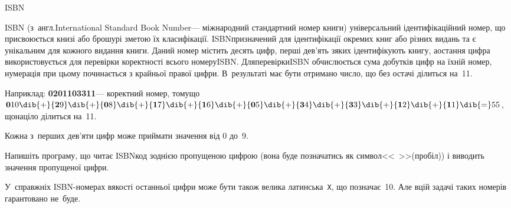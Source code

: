 \begin{problemAllDefault}{ISBN}

ISBN (з~англ.\nolinebreak[2] International Standard Book Number\nolinebreak[3] --- міжнародний стандартний номер книги) універсальний ідентифікаційний номер, що присвоюється книзі або брошурі з\nolinebreak[3] метою їх класифікації. ISBN\nolinebreak[3] призначений для ідентифікації окремих книг або різних видань та є унікальним для кожного видання книги. Даний номер містить десять цифр, перші дев'ять з\nolinebreak[3] яких ідентифікують книгу, а\nolinebreak[3] остання цифра використовується для перевірки коректності всього номеру\nolinebreak[3] ISBN. Для\nolinebreak[3] перевірки\nolinebreak[3] ISBN обчислюється сума добутків цифр на їхній номер, нумерація при цьому починається з крайньої правої цифри. В~результаті має бути отримано число, що без остачі ділиться на~11.

Наприклад: \textbf{0201103311}\nolinebreak[3] --- коректний номер, тому\nolinebreak[3] що ${\mathbf{0}{\*}10}\dib{{+}}{\mathbf{2}{\*}9}\dib{{+}}{\mathbf{0}{\*}8}\dib{{+}}{\mathbf{1}{\*}7}\dib{{+}}{\mathbf{1}{\*}6}\dib{{+}}{\mathbf{0}{\*}5}\dib{{+}}{\mathbf{3}{\*}4}\dib{{+}}{\mathbf{3}{\*}3}\dib{{+}}{\mathbf{1}{\*}2}\dib{{+}}{\mathbf{1}{\*}1}\dib{{=}}55$, що\nolinebreak[3] націло ділиться на~11.

Кожна з~перших дев'яти цифр може приймати значення від 0 до~9. 

Напишіть програму, що читає ISBN\nolinebreak[2] код з\nolinebreak[3] однією пропущеною цифрою (вона буде позначатись як символ\nolinebreak[2] <<~>>\nolinebreak[3] (пробіл)) і виводить значення пропущеної цифри.


\Example
\begin{exampleSimple}{5em}{3em}%
%
\end{exampleSimple}

\Note	У~справжніх ISBN-номерах в\nolinebreak[3] якості останньої цифри може бути також велика латинська~\texttt{X}, що позначає~10. Але в\nolinebreak[3] цій задачі таких номерів гарантовано не~буде.

\end{problemAllDefault}
